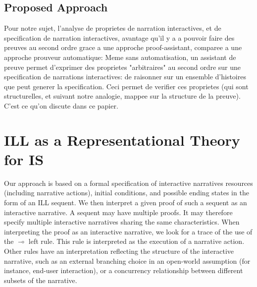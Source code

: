 \documentclass[runningheads,a4paper]{llncs}
\begin{document}
\subsection{Proposed Approach}
Pour notre sujet, l'analyse de proprietes de narration interactives, et de specification de narration interactives, avantage qu'il y a a pouvoir faire des preuves au second ordre grace a une approche proof-assistant, comparee a une approche prouveur automatique: Meme sans automatisation, un assistant de preuve permet d'exprimer des proprietes "arbitraires" au second ordre sur une specification de narrations interactives: de raisonner sur un ensemble d'histoires que peut generer la specification. Ceci permet de verifier ces proprietes (qui sont structurelles, et suivant notre analogie, mappee sur la structure de la preuve). C'est ce qu'on discute dans ce papier.
\section{ILL as a Representational Theory for IS}
%
Our approach is based on a formal specification of interactive narratives resources (including narrative actions), initial conditions, and possible ending states in the form of an ILL sequent. We then interpret a given proof of such a sequent as an interactive narrative. A sequent may have multiple proofs. It may therefore specify multiple interactive narratives sharing the same characteristics. When interpreting the proof as an interactive narrative, we look for a trace of the use of the $\multimap$ left rule. This rule is interpreted as the execution of a narrative action. Other rules have an interpretation reflecting the structure of the interactive narrative, such as an external branching choice in an open-world assumption (for instance, end-user interaction), or a concurrency relationship between different subsets of the narrative. 
\end{document}
